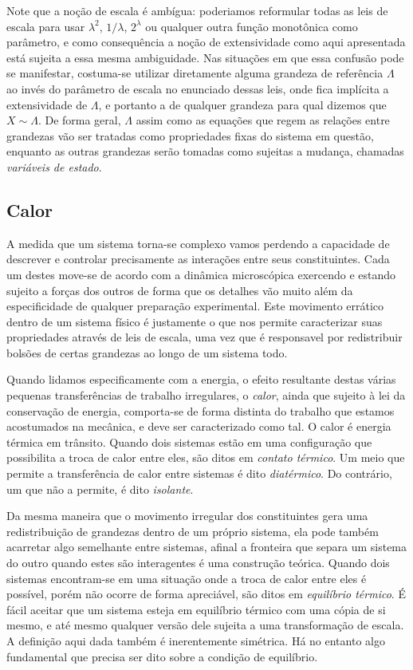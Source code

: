 Note que a noção de escala é ambígua: poderiamos reformular todas as leis de
escala para usar $\lambda^2$, $1/\lambda$, $2^\lambda$ ou qualquer outra função
monotônica como parâmetro, e como consequência a noção de extensividade como
aqui apresentada está sujeita a essa mesma ambiguidade. Nas situações em que
essa confusão pode se manifestar, costuma-se utilizar diretamente alguma
grandeza de referência $\Lambda$ ao invés do parâmetro de escala no enunciado
dessas leis, onde fica implícita a extensividade de $\Lambda$, e portanto a de
qualquer grandeza para qual dizemos que $X\sim\Lambda$. De forma geral,
$\Lambda$ assim como as equações que regem as relações entre grandezas vão ser
tratadas como propriedades fixas do sistema em questão, enquanto as outras
grandezas serão tomadas como sujeitas a mudança, chamadas \emph{variáveis de
estado}.

\subsection{Calor}

A medida que um sistema torna-se complexo vamos perdendo a capacidade de
descrever e controlar precisamente as interações entre seus constituintes. Cada
um destes move-se de acordo com a dinâmica microscópica exercendo e estando
sujeito a forças dos outros de forma que os detalhes vão muito além da
especificidade de qualquer preparação experimental. Este movimento errático
dentro de um sistema físico é justamente o que nos permite caracterizar suas
propriedades através de leis de escala, uma vez que é responsavel por
redistribuir bolsões de certas grandezas ao longo de um sistema todo.

Quando lidamos especificamente com a energia, o efeito resultante destas várias
pequenas transferências de trabalho irregulares, o \emph{calor}, ainda que
sujeito à lei da conservação de energia, comporta-se de forma distinta do
trabalho que estamos acostumados na mecânica, e deve ser caracterizado como tal.
O calor é energia térmica em trânsito. Quando dois sistemas estão em uma
configuração que possibilita a troca de calor entre eles, são ditos em \emph{
contato térmico}. Um meio que permite a transferência de calor entre sistemas é
dito \emph{diatérmico}. Do contrário, um que não a permite, é dito \emph{
isolante}.

Da mesma maneira que o movimento irregular dos constituintes gera uma
redistribuição de grandezas dentro de um próprio sistema, ela pode também
acarretar algo semelhante entre sistemas, afinal a fronteira que separa um
sistema do outro quando estes são interagentes é uma construção teórica. Quando
dois sistemas encontram-se em uma situação onde a troca de calor entre eles é
possível, porém não ocorre de forma apreciável, são ditos em \emph{equilíbrio
térmico}. É fácil aceitar que um sistema esteja em equilíbrio térmico com uma
cópia de si mesmo, e até mesmo qualquer versão dele sujeita a uma transformação
de escala. A definição aqui dada também é inerentemente simétrica. Há no entanto
algo fundamental que precisa ser dito sobre a condição de equilíbrio.

